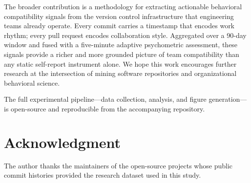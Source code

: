 \documentclass[conference]{IEEEtran}
\begin{document}
The broader contribution is a methodology for extracting actionable
behavioral compatibility signals from the version control
infrastructure that engineering teams already operate.  Every commit
carries a timestamp that encodes work rhythm; every pull request
encodes collaboration style.  Aggregated over a 90-day window and
fused with a five-minute adaptive psychometric assessment, these
signals provide a richer and more grounded picture of team
compatibility than any static self-report instrument alone.  We
hope this work encourages further research at the intersection of
mining software repositories and organizational behavioral science.

The full experimental pipeline---data collection, analysis, and
figure generation---is open-source and reproducible from the
accompanying repository.

\section*{Acknowledgment}

The author thanks the maintainers of the open-source projects
whose public commit histories provided the research dataset used
in this study.

%   
%   
\end{document}
